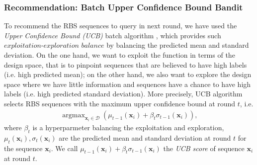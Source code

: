 
\subsubsection{Recommendation: Batch Upper Confidence Bound Bandit}

To recommend the RBS sequences to query in next round, we have used the \textit{Upper Confidence Bound (UCB)} batch algorithm \cite{srinivas2012information}, which provides such $\textit{exploitation-exploration balance}$ by balancing the predicted mean and standard deviation.
On the one hand, we want to exploit the function in terms of the design space, that is to pinpoint sequences that are believed to have high labels (i.e. high predicted mean); 
on the other hand, we also want to explore the design space where we have little information and sequences have a chance to have high labels (i.e. high predicted standard deviation).
More precisely, UCB algorithm selects RBS sequences with the maximum upper confidence bound at round $t$, i.e.
\begin{align}
\label{Eq: GPUCB}
    \operatorname{argmax}_{\mathbf{x}_i \in \mathcal{D}} \left( \mu_{t-1}(\mathbf{x}_i) + \beta_t \sigma_{t-1}(\mathbf{x}_i)\right),
\end{align}
where $\beta_t$ is a hyperparmeter balancing the exploitation and exploration, 
$\mu_t(\mathbf{x}_i), \sigma_t(\mathbf{x}_i)$ are the predicted mean and standard deviation at round $t$ for the sequence $\mathbf{x}_i$.
We call $\mu_{t-1}(\mathbf{x}_i) + \beta_t \sigma_{t-1}(\mathbf{x}_i)$ the \textit{UCB score} of sequence $\mathbf{x}_i$ at round $t$.


